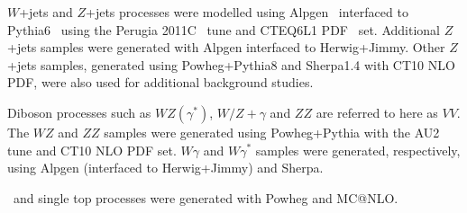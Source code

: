 \par $W$+jets and $Z$+jets processes were modelled using Alpgen~\cite{Alpgen} interfaced to 
 {Pythia}6~\cite{Pythia6} using the Perugia 2011C~\cite{PerugiaTune} 
tune and CTEQ6L1 PDF~\cite{CTEQ6L1} set. Additional $Z$+jets samples were 
generated with Alpgen interfaced to Herwig+Jimmy. Other $Z$+jets samples, generated using {Powheg+Pythia8} 
and {Sherpa1.4} with CT10 NLO PDF, were also used for additional background studies.  

\par Diboson processes such as $WZ(\gamma^*)$, $W/Z+\gamma$ and $ZZ$ are referred to 
here as $VV$. The $WZ$ and $ZZ$ samples were generated using {Powheg+Pythia} with 
the AU2 tune and CT10 NLO PDF set. $W\gamma$ and $W\gamma^*$ samples were generated, respectively, 
using {Alpgen} (interfaced to {Herwig+Jimmy}) and {Sherpa}.

\par \ttbar\ and single top processes were generated with Powheg and MC@NLO.   
